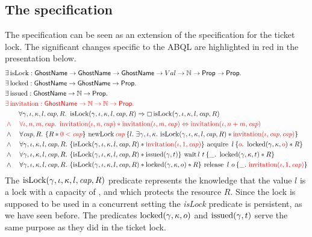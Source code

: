 \subsection{The specification}

The specification can be seen as an extension of the specification for the
ticket lock. The significant changes specific to the ABQL are highlighted in red
in the presentation below.
\begin{align*}
  & \exists \isLock : \GN \to \GN \to \GN \to Val \to \nat \to \Prop \to \Prop. \\
  & \exists \locked : \GN \to \GN \to \Prop. \\
  & \exists \issued : \GN \to \nat \to \Prop. \\
  & \addition{\exists \invitation : \GN \to \nat \to \nat \to \Prop.} \\
  & \quad\quad \forall \gamma, \iota, \kappa, l, \Cap, R.\ \isLockA \Rightarrow \persistently \isLockA \\
  & \color{red} \land\quad \forall \iota, n, m, \Cap.\ \invitation(\iota, n, \Cap) \ast \invitation(\iota, m, \Cap)
       \Leftrightarrow \invitation(\iota, n + m, \Cap) \\
  & \land\quad \forall \Cap, R.\ \hoare{ R \ast \addition{0 < \Cap} }
      { \newLock \addition{\Cap} }
      { l.\ \Exists \gamma, \iota, \kappa. \isLockA \ast \addition{\invitation(\iota, \Cap, \Cap) }} \\
  & \land\quad \forall \gamma, \iota, \kappa, l, \Cap, R.\ \hoare{ \isLockA \ast \addition{\invitation(\iota, 1, \Cap)} }
      { \acquire\ l }
      { \addition{o}.\ \locked(\gamma, \kappa, \addition{o}) \ast R }  \\
  & \land\quad \forall \gamma, \iota, \kappa, l, \Cap, R.\ \hoare{ \isLockA \ast \issued(\gamma, t) }
      { \wait l\ t}
      { \_.\ \locked(\gamma, \kappa, t) \ast R } \\
  & \land\quad \forall \gamma, \iota, \kappa, l, \Cap, R.\ \hoare{ \isLockA \ast \lockedGKO \ast R }
      { \release\ l\ o }
      { \_.\ \addition{\invitation(\iota, 1, \Cap)} }
\end{align*}
The $\operatorname{isLock}(\gamma, \iota, \kappa, l, \textit{cap}, R)$ predicate represents the knowledge that the value $l$ is a lock
with a capacity of \Cap, and which protects the resource $R$. Since the lock is
supposed to be used in a concurrent setting the \textit{isLock} predicate is
persistent, as we have seen before.
The predicates $\text{locked}(\gamma, \kappa, o)$ and $\operatorname{issued}(\gamma, t)$ serve the same
purpose as they did in the ticket lock.

